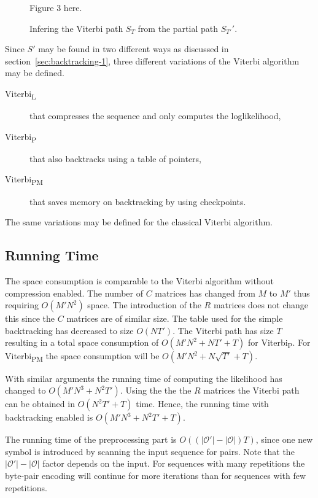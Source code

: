 \begin{figure}
  \centering
  Figure 3 here.
  \caption{Infering the Viterbi path $S_T$ from the partial path $S_{T'}'$.}
  \label{fig:infering-viterbi-path}
\end{figure}

Since $S'$ may be found in two different ways as discussed in
section~\ref{sec:backtracking-1}, three different variations of the Viterbi
algorithm may be defined.
\begin{description}
\item[Viterbi\textsubscript{L}] that compresses the sequence and only computes the
  loglikelihood,
\item[Viterbi\textsubscript{P}] that also backtracks using a table of pointers,
\item[Viterbi\textsubscript{PM}] that saves memory on backtracking by using checkpoints.
\end{description}
The same variations may be defined for the classical Viterbi algorithm.

\subsection{Running Time}
\label{sec:running-time}

The space consumption is comparable to the Viterbi algorithm without
compression enabled. The number of $C$ matrices has changed from $M$ to $M'$
thus requiring $O(M' N^2)$ space. The introduction of the $R$ matrices does not
change this since the $C$ matrices are of similar size. The table used for the
simple backtracking has decreased to size $O(N T')$. The Viterbi path has size
$T$ resulting in a total space consumption of $O(M' N^2 + N T' + T)$ for
Viterbi\textsubscript{P}. For Viterbi\textsubscript{PM} the space consumption will be
$O(M' N^2 + N \sqrt{T'} + T)$.

With similar arguments the running time of computing the likelihood has changed
to $O(M' N^3 +N^2 T')$. Using the the the $R$ matrices the Viterbi path can be
obtained in $O(N^2 T' + T)$ time. Hence, the running time with backtracking
enabled is $O(M' N^3 +N^2 T' + T)$.

The running time of the preprocessing part is $O(
\left(
  \lvert\mathcal{O'}\rvert - \lvert{\mathcal{O}}\rvert
\right) T)$, since one new symbol is introduced by scanning the input sequence for
pairs. Note that the $\lvert\mathcal{O'}\rvert - \lvert{\mathcal{O}}\rvert$
factor depends on the input. For sequences with many repetitions the byte-pair
encoding will continue for more iterations than for sequences with few
repetitions.

